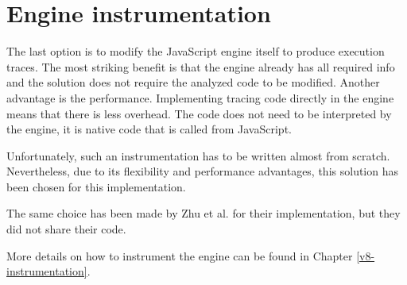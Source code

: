 \section{Engine instrumentation}
The last option is to modify the JavaScript engine itself to produce execution traces.
The most striking benefit is that the engine already has all required info and the solution 
does not require the analyzed code to be modified.
Another advantage is the performance. Implementing tracing code directly in the engine means 
that there is less overhead. The code does not need to be interpreted by the engine, it is native code
that is called from JavaScript.

Unfortunately, such an instrumentation has to be written almost from scratch. 
Nevertheless, due to its flexibility and performance advantages, this solution has been chosen 
for this implementation.

The same choice has been made by Zhu et al. \cite{DBLP:conf/ndss/ZhuHQSY18} for their implementation, 
but they did not share their code.

More details on how to instrument the engine can be found in Chapter \ref{v8-instrumentation}.
